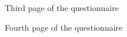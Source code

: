 \documentclass[12pt,oneside,openright,a4paper]{cpe-english-project}
\begin{document}
      \begin{figure}[!h]
        \centering
        \caption{Third page of the questionnaire}\label{fig:Survey_3}
      \end{figure}
      \begin{figure}[!h]
        \centering
        \caption{Fourth page of the questionnaire}\label{fig:Survey_4}
      \end{figure}
      \FloatBarrier{}
\end{document}
